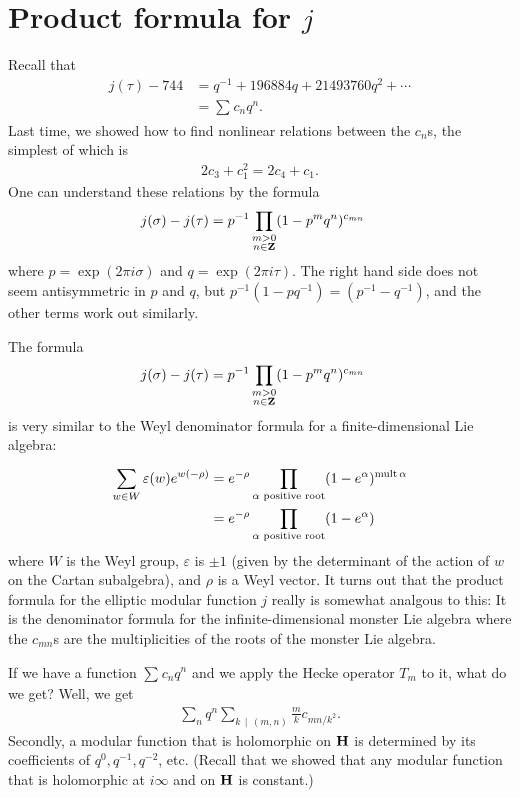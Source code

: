 \documentclass[11pt, oneside,margin=1in]{article}
\begin{document}
\section{Product formula for $j$}
Recall that
\begin{align*}
	j(\tau) - 744 &= q ^{-1} + 196884q + 21493760q^2 + \cdots\\
		      &= \sum_{}^{} c_nq^n.
\end{align*}
Last time, we showed how to find nonlinear relations between the $c_n$s, the simplest of which is
\begin{align*}
	2c_3 + c_1^2 = 2c_4 + c_1.
\end{align*}
One can understand these relations by the formula
\begin{align*}
	j(\sigma)-j(\tau) &= p^{-1} \prod_{\substack{ m > 0\\n\in \mathbf Z}} (1-p^mq^n)^{c_{mn}}
\end{align*}
where $p=\exp(2\pi i \sigma)$ and $q = \exp(2\pi i \tau)$. The right hand side does not seem antisymmetric in $p$ and $q$, but $p^{-1}(1-pq^{-1}) = (p^{-1}-q^{-1})$, and the other terms work out similarly.

The formula \begin{align*}
	j(\sigma)-j(\tau) &= p^{-1} \prod_{\substack{ m > 0\\n\in \mathbf Z}} (1-p^mq^n)^{c_{mn}}
\end{align*}
is very similar to the Weyl denominator formula for a finite-dimensional Lie algebra:
\begin{align*}
	\sum_{w\in W}^{} \varepsilon(w)e^{w (-\rho)} &= e^{-\rho} \prod_{\alpha \textrm{ positive root}}  (1-e^\alpha)^{\operatorname{mult} \alpha} \\&= e^{-\rho} \prod_{\alpha \textrm{ positive root}}  (1-e^\alpha)
\end{align*}
where $W$ is the Weyl group, $\varepsilon$ is $\pm 1$ (given by the determinant of the action of $w$ on the Cartan subalgebra), and $\rho $ is a Weyl vector. It turns out that the product formula for the elliptic modular function $j$ really is somewhat analgous to this: It is the denominator formula for the infinite-dimensional monster Lie algebra where the $c_{mn}$s are the multiplicities of the roots of the monster Lie algebra.

If we have a function $\sum_{}^{} c_nq^n$ and we apply the Hecke operator $T_m$ to it, what do we get? Well, we get
\begin{align*}
	\sum_{n}^{} q^n \sum_{k\, \mid \, (m,n)}^{} \frac{m}{k}c_{mn/k^2}.
\end{align*}
Secondly, a modular function that is holomorphic on $\mathbf H$ is determined by its coefficients of $q^0,q^{-1}, q^{-2}$, etc. (Recall that we showed that any modular function that is holomorphic at $i\infty$ and on $\mathbf H$ is constant.)
\end{document}
